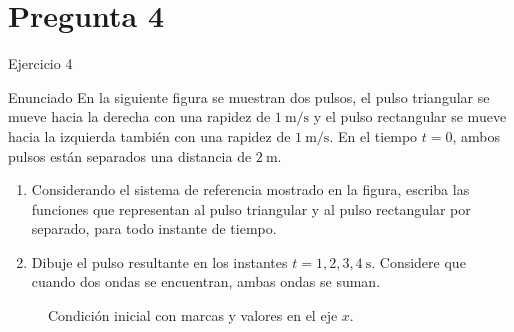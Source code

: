 \documentclass[
    10pt,
    aspectratio=169,
    xcolor={dvipsnames},
    spanish,
    ]{beamer}
\begin{document}
\section{Pregunta 4}
\begin{frame}{Ejercicio 4}
  \begin{block}{Enunciado}
En la siguiente figura se muestran dos pulsos, el pulso triangular se mueve hacia la derecha con una rapidez de $1~\mathrm{m/s}$ y el pulso rectangular se mueve hacia la izquierda también con una rapidez de $1~\mathrm{m/s}$. En el tiempo $t=0$, ambos pulsos están separados una distancia de $2~\mathrm{m}$.

\begin{enumerate}
  \item Considerando el sistema de referencia mostrado en la figura, escriba las funciones
  que representan al pulso triangular y al pulso rectangular por separado, para todo instante de tiempo.
  \item Dibuje el pulso resultante en los instantes $t=1,2,3,4~\mathrm{s}$. Considere que cuando
  dos ondas se encuentran, ambas ondas se suman.
\end{enumerate}

\begin{figure}[h!]
\centering
{}
\caption{Condición inicial con marcas y valores en el eje $x$.}
\end{figure}
\end{block}
\end{frame}
\end{document}
